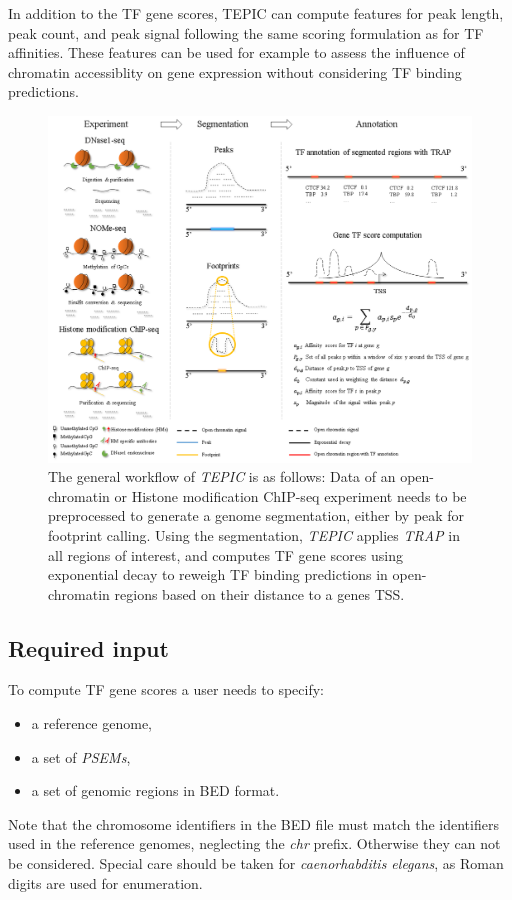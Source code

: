 \documentclass{article}
\begin{document}
In addition to the TF gene scores, TEPIC can compute features for peak length, peak count, and peak signal following the same scoring formulation as for
TF affinities. These features can be used for example to assess the influence of chromatin accessiblity on gene expression without considering TF binding
predictions. 
\begin{figure}[h!]
\begin{center}
\includegraphics[width=\textwidth]{Workflow.png}
\end{center}
\caption{The general workflow of \textit{TEPIC} is as follows: 
Data of an open-chromatin or Histone modification ChIP-seq experiment needs to be preprocessed to generate a genome segmentation, 
either by peak for footprint calling. 
Using the segmentation, \textit{TEPIC} applies \textit{TRAP} in all regions of interest, and computes TF gene scores using exponential decay to reweigh 
TF binding predictions in open-chromatin regions based on their distance to a genes TSS.} 
\label{workflowFig}
\end{figure}

\newpage
\subsection*{Required input}
To compute TF gene scores a user needs to specify:
\begin{itemize}
\item a reference genome,
\item a set of \textit{PSEMs},
\item a set of genomic regions in BED format.
\end{itemize}
Note that the chromosome identifiers in the BED file must match the identifiers used in the reference genomes, neglecting the \textit{chr} prefix. 
Otherwise they can not be considered. 
Special care should be taken for \textit{caenorhabditis elegans}, as Roman digits are used for enumeration.
\end{document}
